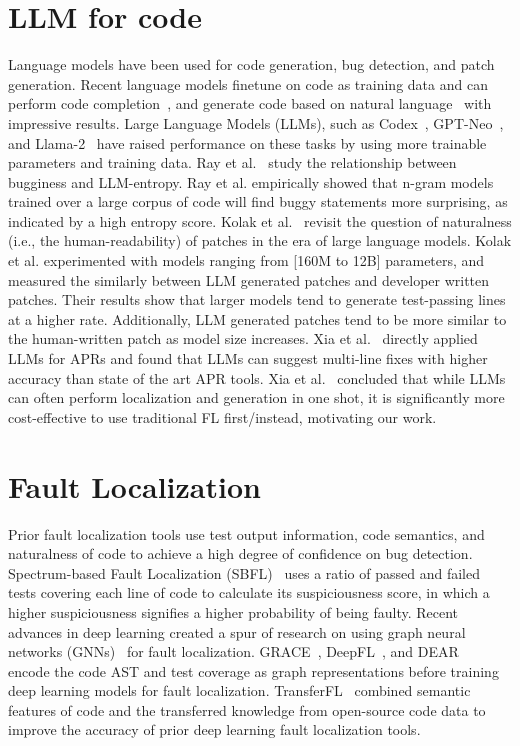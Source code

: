 \documentclass[12pt,openany,oneside,table]{cmuthesis}
\begin{document}
\section{LLM for code}
Language models have been used for code generation, bug detection, and patch
generation. Recent language models finetune on code as training data and can
perform code completion~\cite{desai2016program, inCoder}, and generate code
based on natural language~\cite{raychev2014code} with impressive results. Large
Language Models (LLMs), such as Codex~\cite{Codex}, GPT-Neo~\cite{Neox}, and
Llama-2~\cite{Llama} have raised performance on these tasks by using more
trainable parameters and training data. Ray et al.~\cite{NAT} study the
relationship between bugginess and LLM-entropy. Ray et al. empirically showed
that n-gram models trained over a large corpus of code will find buggy
statements more surprising, as indicated by a high entropy score. 
Kolak et
al.~\cite{LLM-PATCH} revisit the question of naturalness (i.e., the
human-readability) of patches in the era of large language models. Kolak et al. experimented with models ranging from [160M to 12B] parameters, and measured the similarly between LLM generated patches and developer written patches. Their
results show that larger models tend to generate test-passing lines at a higher
rate. Additionally, LLM generated patches tend to be more similar to the
human-written patch as model size increases. Xia et al.~\cite{xia2023automated} directly applied LLMs for APRs and found that LLMs can suggest multi-line fixes with higher accuracy than state of the art APR tools. Xia et al.~\cite{xia2023automated} concluded that while LLMs can often perform localization and generation in one shot, it is significantly more cost-effective to use traditional FL first/instead, motivating our work. 

\section{Fault Localization}
Prior fault localization tools use test output information, code semantics, and
naturalness of code to achieve a high degree of confidence on bug detection.
Spectrum-based Fault Localization (SBFL)~\cite{abreu2006evaluation,
abreu2007accuracy} uses a ratio of passed and failed tests covering each line of
code to calculate its suspiciousness score, in which a higher suspiciousness
signifies a higher probability of being faulty. Recent advances in deep learning
created a spur of research on using graph neural networks (GNNs)~\cite{GNN} for
fault localization. GRACE~\cite{Grace}, DeepFL~\cite{DeepFL}, and
DEAR~\cite{Dear} encode the code AST and test coverage as graph representations
before training deep learning models for fault localization.
TransferFL~\cite{TransferFL} combined semantic features of code and the
transferred knowledge from open-source code data to improve the accuracy of
prior deep learning fault localization tools.
\end{document}
